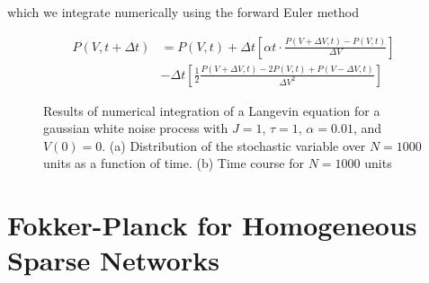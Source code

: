 \documentclass{ucetd}
\begin{document}
which we integrate numerically using the forward Euler method

\begin{align*}
P(V, t+\Delta t) &= P(V,t)+ \Delta t\left[\alpha t\cdot \frac{P(V+\Delta V, t) - P(V,t)}{\Delta V}\right] \\
&- \Delta t\left[\frac{1}{2}\frac{P(V+\Delta V, t) - 2P(V,t) + P(V-\Delta V, t)}{\Delta V^{2}}\right]
\end{align*} 

\begin{figure}
\centering
{}
\caption{Results of numerical integration of a Langevin equation for a gaussian white noise process with $J=1$, $\tau=1$, $\alpha=0.01$, and $V(0)=0$. (a) Distribution of the stochastic variable over $N=1000$ units as a function of time. (b) Time course for $N=1000$ units}
\end{figure}


\section{Fokker-Planck for Homogeneous Sparse Networks}
\end{document}
